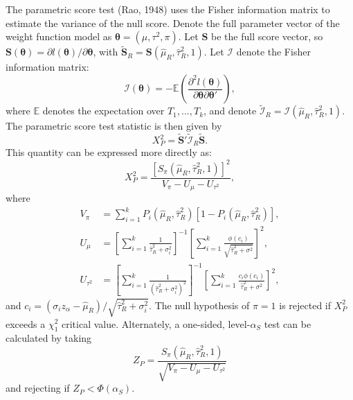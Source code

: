 \documentclass[man,floatsintext]{apa6}
\begin{document}
The parametric score test (Rao, 1948) uses the Fisher information matrix to estimate the variance of the null score. Denote the full parameter vector of the weight function model as \(\boldsymbol\theta = (\mu, \tau^2, \pi)\). Let \(\bm{S}\) be the full score vector, so \(\bm{S}(\boldsymbol\theta) = \partial l(\boldsymbol\theta) / \partial \boldsymbol\theta\), with \(\bm{\tilde{S}}_R = \bm{S}(\hat\mu_R, \hat\tau^2_R, 1)\). Let \(\mathcal{I}\) denote the Fisher information matrix:
\[
\mathcal{I}(\boldsymbol\theta) = - \mathbb{E}\left(\frac{\partial^2 l(\boldsymbol\theta)}{\partial \boldsymbol\theta \partial \boldsymbol\theta'} \right),
\]
where \(\mathbb{E}\) denotes the expectation over \(T_1,...,T_k\), and denote \(\tilde{\mathcal{I}}_R = \mathcal{I}(\hat\mu_R, \hat\tau^2_R, 1)\). The parametric score test statistic is then given by
\[
X^2_P = \bm{\tilde{S}}'\tilde{\mathcal{I}}_R \bm{\tilde{S}}.
\]
This quantity can be expressed more directly as:
\begin{equation}
X^2_P = \frac{\left[S_\pi(\hat\mu_R, \hat\tau^2_R, 1)\right]^2}{V_\pi - U_\mu - U_{\tau^2}},
\label{eq:parametric-score}
\end{equation}
where
\[
\begin{aligned}
V_\pi &= \sum_{i=1}^k P_i(\hat\mu_R, \hat\tau^2_R) \left[1 - P_i(\hat\mu_R, \hat\tau^2_R)\right], \\
U_\mu &= \left[\sum_{i=1}^k \frac{1}{\hat\tau_R^2 + \sigma_i^2}\right]^{-1}\left[\sum_{i=1}^k \frac{\phi(c_i)}{\sqrt{\hat\tau^2_R + \sigma^2}}\right]^2, \\
U_{\tau^2} &= \left[\sum_{i=1}^k \frac{1}{\left(\hat\tau_R^2 + \sigma_i^2\right)^2}\right]^{-1}\left[\sum_{i=1}^k \frac{c_i\phi(c_i)}{\hat\tau^2_R + \sigma^2}\right]^2,
\end{aligned}
\]
and \(c_i = \left(\sigma_i z_\alpha - \hat\mu_R\right) / \sqrt{\hat\tau^2_R + \sigma_i^2}\).
The null hypothesis of \(\pi = 1\) is rejected if \(X^2_P\) exceeds a \(\chi^2_1\) critical value.
Alternately, a one-sided, level-\(\alpha_S\) test can be calculated by taking
\begin{equation}
Z_P = \frac{S_\pi(\hat\mu_R, \hat\tau^2_R, 1)}{\sqrt{V_\pi - U_\mu - U_{\tau^2}}}
\end{equation}
and rejecting if \(Z_P < \Phi(\alpha_S)\).
\end{document}
